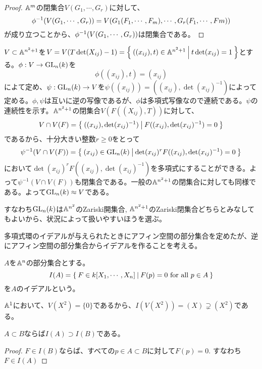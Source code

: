 \documentclass{ltjsreport}
\begin{document}
\begin{proof}
  $\mathbb{A}^m$の閉集合$V(G_1,\cdots,G_r)$に対して、
  \[
  \phi^{-1}(V(G_1,\cdots,G_r))=V(G_1(F_1,\cdots,F_m),\cdots,G_r(F_1,\cdots,Fm))  
  \]
  が成り立つことから、$\phi^{-1}(V(G_1,\cdots,G_r))$は閉集合である。
\end{proof}

\begin{eg}\label{affine_gl_n}
  $V\subset\mathbb{A}^{n^2+1}$を$V=V(T\det(X_{ij})-1)=\left\{\:((x_{ij}),t)\in\mathbb{A}^{n^2+1}\:\middle|\:t\det(x_{ij})=1\:\right\}$とする。$\phi:V\rightarrow \text{GL}_n(k)$を
  \[
  \phi((x_{ij}),t)=(x_{ij})  
  \]
  によて定め、$\psi:\text{GL}_n(k)\rightarrow V$を$\psi((x_{ij}))=((x_{ij}),\det(x_{ij})^{-1})$によって定める。$\phi,\psi$は互いに逆の写像であるが、$\phi$は多項式写像なので連続である。$\psi$の連続性を示す。$\mathbb{A}^{n^2+1}$の閉集合$V(F((X_{ij}),T))$に対して、
  \[
  V\cap V(F)=\left\{\:((x_{ij}),\det(x_{ij})^{-1})\:\middle|\:F((x_{ij}),\det(x_{ij})^{-1})=0\:\right\}  
  \]
  であるから、十分大きい整数$r\geq 0$をとって
  \[
  \psi^{-1}(V\cap V(F))=\left\{\:(x_{ij})\in\text{GL}_n(k)\:\middle|\:\det(x_{ij})^rF((x_{ij}),\det(x_{ij})^{-1})=0\:\right\}  
  \]
  において$\det(x_{ij})^rF((x_{ij}),\det(x_{ij})^{-1})$を多項式にすることができる。よって$\psi^{-1}(V\cap V(F))$も閉集合である。一般の$\mathbb{A}^{n^2+1}$の閉集合に対しても同様である。よって$\text{GL}_n(k)\approx V$である。

  すなわち$\text{GL}_n(k)$は$\mathbb{A}^{n^2}$のZariski開集合, $\mathbb{A}^{n^2+1}$のZariski閉集合どちらとみなしてもよいから、状況によって扱いやすいほうを選ぶ。
\end{eg}




多項式環のイデアルが与えられたときにアフィン空間の部分集合を定めたが、逆にアフィン空間の部分集合からイデアルを作ることを考える。

\begin{defin}
  $A$を$\mathbb{A}^n$の部分集合とする。
  \[
  I(A)=\left\{\:F\in k[X_1,\cdots,X_n]\:\middle|\:F(p)=0 \text{ for all }p\in A\:\right\}
  \]
  を$A$のイデアルという。
\end{defin}

\begin{eg}
  $\mathbb{A}^1$において、$V(X^2)=\{0\}$であるから、$I(V(X^2))=(X)\supsetneq (X^2)$である。
\end{eg}

\begin{prop}\label{containment2}
  $A\subset B$ならば$I(A)\supset I(B)$である。
\end{prop}

\begin{proof}
  $F\in I(B)$ならば、すべての$p\in A\subset B$に対して$F(p)=0$. すなわち$F\in I(A)$
\end{proof}
\end{document}
